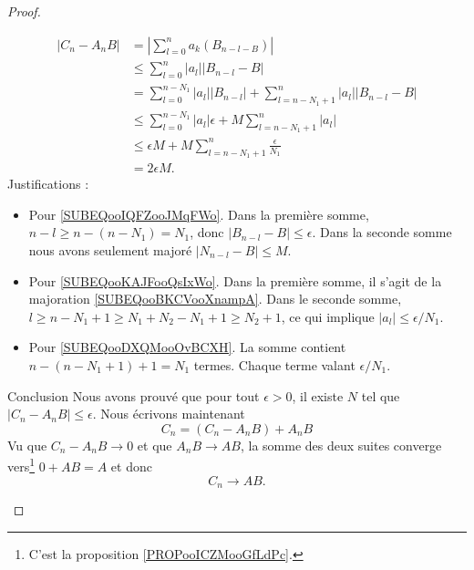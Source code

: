 \begin{proof}
\begin{subproof}
        \begin{subequations}
            \begin{align}
                | C_n-A_nB |&=| \sum_{l=0}^na_k(B_{n-l-B}) |\\
                &\leq \sum_{l=0}^n| a_l | |B_{n-l}-B |\\
                &=\sum_{l=0}^{n-N_1}| a_l | |B_{n-l} |+\sum_{l=n-N_1+1}^n| a_l | |B_{n-l}-B |\\
                &\leq \sum_{l=0}^{n-N_1}| a_l |\epsilon+M\sum_{l=n-N_1+1}^n| a_l |      \label{SUBEQooIQFZooJMqFWo}\\
                &\leq \epsilon M +M\sum_{l=n-N_1+1}^n\frac{ \epsilon }{ N_1 }      \label{SUBEQooKAJFooQsIxWo}\\
                &=2\epsilon M.   \label{SUBEQooDXQMooOvBCXH}
            \end{align}
        \end{subequations}
        Justifications :
        \begin{itemize}
            \item Pour \eqref{SUBEQooIQFZooJMqFWo}. Dans la première somme, \( n-l\geq n-(n-N_1)=N_1\), donc \( | B_{n-l}-B |\leq \epsilon\). Dans la seconde somme nous avons seulement majoré \( | N_{n-l}-B |\leq M\).
            \item Pour \eqref{SUBEQooKAJFooQsIxWo}. Dans la première somme, il s'agit de la majoration \eqref{SUBEQooBKCVooXnampA}. Dans le seconde somme, \( l\geq n-N_1+1\geq N_1+N_2-N_1+1\geq N_2+1\), ce qui implique \( | a_l |\leq \epsilon/N_1\).
            \item Pour \eqref{SUBEQooDXQMooOvBCXH}. La somme contient \( n-(n-N_1+1)+1=N_1\) termes. Chaque terme valant \( \epsilon/N_1\).
        \end{itemize}
    \item[Conclusion]
        Nous avons prouvé que pour tout \( \epsilon>0\), il existe \( N\) tel que \( | C_n-A_nB |\leq \epsilon\). Nous écrivons maintenant
        \begin{equation}
            C_n=(C_n-A_nB)+A_nB
        \end{equation}
        Vu que \( C_n-A_nB\to 0\) et que \( A_nB\to AB\), la somme des deux suites converge vers\footnote{C'est la proposition \ref{PROPooICZMooGfLdPc}.} \( 0+AB=A\) et donc
        \begin{equation}
            C_n\to AB.
        \end{equation}
    \end{subproof}
\end{proof}


